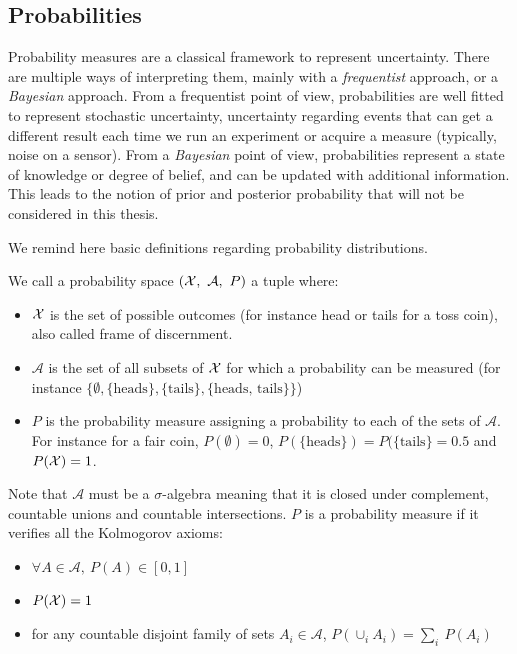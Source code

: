 \subsection{Probabilities}\label{sec:probabilities}
Probability measures are a classical framework to represent uncertainty. There are multiple ways of interpreting them, mainly with a \textit{frequentist} approach, or a \textit{Bayesian} approach. From a frequentist point of view, probabilities are well fitted to represent stochastic uncertainty, \ie uncertainty regarding events that can get a different result each time we run an experiment or acquire a measure (typically, noise on a sensor). From a \textit{Bayesian} point of view, probabilities represent a state of knowledge or degree of belief, and can be updated with additional information. This leads to the notion of prior and posterior probability that will not be considered in this thesis.

We remind here basic definitions regarding probability distributions.
\begin{definition}\label{def:probability_space}
    We call a probability space $({\mathcal{X}},~\mathcal{A},~P)$ a tuple where:
    \begin{itemize}
        \item ${\mathcal{X}}$ is the set of possible outcomes (for instance head or tails for a toss coin), also called frame of discernment.
        \item $\mathcal{A}$ is the set of all subsets of ${\mathcal{X}}$ for which a probability can be measured (for instance $\{\emptyset, \{\text{heads}\}, \{\text{tails}\}, \{\text{heads, tails}\}\}$)
        \item $P$ is the probability measure assigning a probability to each of the sets of $\mathcal{A}$. For instance for a fair coin, $P(\emptyset)=0$, $P(\{\text{heads}\})=P(\{\text{tails}\}=0.5$ and $P({\mathcal{X}})=1$.
    \end{itemize}
    Note that $\mathcal{A}$ must be a $\sigma$-algebra meaning that it is closed under complement, countable unions and countable intersections. $P$ is a probability measure if it verifies all the Kolmogorov axioms:
    \begin{itemize}
        \item $\forall A\in\mathcal{A},~P(A)\in[0,1]$
        \item $P({\mathcal{X}}) = 1$
        \item for any countable disjoint family of sets $A_i\in\mathcal{A}$, $P(\cup_i A_i)=\sum_i~P(A_i)$
    \end{itemize}
\end{definition}

